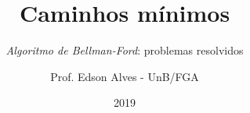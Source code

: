 \title{Caminhos mínimos}
\subtitle{\textit{Algoritmo de Bellman-Ford}: problemas resolvidos}
\author{Prof. Edson Alves - UnB/FGA}
\date{2019}
